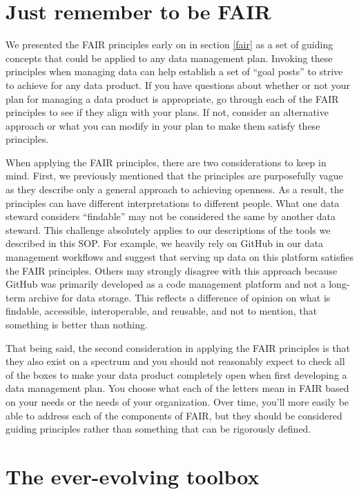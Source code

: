 \documentclass[
]{book}
\begin{document}
\section{Just remember to be FAIR}\label{just-remember-to-be-fair}

We presented the FAIR principles early on in section \ref{fair} as a set of guiding concepts that could be applied to any data management plan. Invoking these principles when managing data can help establish a set of ``goal posts'' to strive to achieve for any data product. If you have questions about whether or not your plan for managing a data product is appropriate, go through each of the FAIR principles to see if they align with your plans. If not, consider an alternative approach or what you can modify in your plan to make them satisfy these principles.

When applying the FAIR principles, there are two considerations to keep in mind. First, we previously mentioned that the principles are purposefully vague as they describe only a general approach to achieving openness. As a result, the principles can have different interpretations to different people. What one data steward considers ``findable'' may not be considered the same by another data steward. This challenge absolutely applies to our descriptions of the tools we described in this SOP. For example, we heavily rely on GitHub in our data management workflows and suggest that serving up data on this platform satisfies the FAIR principles. Others may strongly disagree with this approach because GitHub was primarily developed as a code management platform and not a long-term archive for data storage. This reflects a difference of opinion on what is findable, accessible, interoperable, and reusable, and not to mention, that something is better than nothing.

That being said, the second consideration in applying the FAIR principles is that they also exist on a spectrum and you should not reasonably expect to check all of the boxes to make your data product completely open when first developing a data management plan. You choose what each of the letters mean in FAIR based on your needs or the needs of your organization. Over time, you'll more easily be able to address each of the components of FAIR, but they should be considered guiding principles rather than something that can be rigorously defined.

\section{The ever-evolving toolbox}\label{the-ever-evolving-toolbox}
\end{document}
